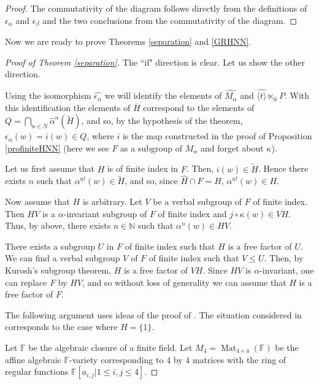 \documentclass{amsart}
\theoremstyle{definition}
\theoremstyle{remark}
\DeclareMathOperator{\Mat}{Mat}
\newcommand{\F}{\mathbb{F}}
\newcommand{\N}{\mathbb{N}}
\begin{document}
\begin{proof}
The commutativity of the diagram follows directly from the definitions of $\epsilon_\alpha$ and $\epsilon_\beta$ and the two conclusions from the commutativity of the diagram.
\end{proof}
Now we are ready to prove Theorems \ref{separation} and \ref{GRHNN}.
\begin{proof}[Proof of Theorem \ref{separation}]
The ``if" direction is clear. Let us show the other direction.

 Using the isomorphism $\widehat{\epsilon_{\alpha}}$ we will identify the elements of $\widehat{M_\alpha}$ and $ \widehat {\langle t\rangle}\ltimes_{\widehat \alpha} P$. With this identification the elements of $\overline H$ correspond to the elements of $Q=\displaystyle \bigcap_{n\in N} \widehat \alpha^n(\widetilde H)$, and so, by the hypothesis of the theorem,  $\epsilon_\alpha (w)=i(w)\in Q$,  where $i$ is the map constructed in the proof of Proposition \ref{profiniteHNN} (here we see $F$ as a subgroup of $M_\alpha$ and forget about $\kappa$).

 
Let us first assume that $H$ is of finite index in $F$. Then,   $i(w)\in   \widetilde H$. Hence there exists $n$ such that $\alpha^{n!}(w)\in \widetilde H$,
 and so, since $\widehat H\cap F=H$,  $\alpha^{n!}(w)\in  H$.

Now assume that $H$ is arbitrary. Let $V$ be a verbal subgroup of $F$ of finite index. Then $HV$ is a $\alpha$-invariant subgroup of $F$ of finite index and $j\circ \kappa(w)\in \overline {VH}$. Thus, by above, there exists $n\in \N$ such that $\alpha^n(w)\in HV$. 

There exists a subgroup $U$ in $F$ of finite index such that $H$ is a free factor of $U$. We can find a verbal subgroup $V$ of $F$ of finite index such that $V\le U$. Then, by Kurosh's subgroup  theorem, $H$ is a free factor of $VH$. Since $HV$ is $\alpha$-invariant, one can replace $F$ by $HV$, and so  without loss of generality we can assume that $H$ is a free factor of $F$.

The  following argument   uses  ideas of the proof of  \cite[Theorem 1.2]{BS05}. The situation considered in  \cite[Theorem 1.2]{BS05} corresponds to the case where $H=\{1\}$.

Let  $\F$ be  the algebraic closure of a finite field. Let  $M_4=\Mat_{4\times 4}(\F)$ be the affine algebraic $\F$-variety corresponding to $4$ by $4$ matrices with  the ring of regular functions $\F[a_{i,j}|1\le i,j\le 4]$. 



\end{proof}
\end{document}
